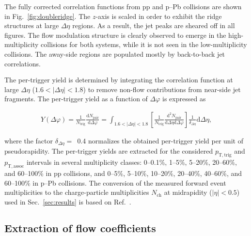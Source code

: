 The fully corrected correlation functions from pp and p--Pb collisions are shown in Fig.~\ref{fig:doubleridge}. 
The $z$-axis is scaled in order to exhibit the ridge structures at large $\Delta\eta$ regions. As a result, the jet peaks are sheared off in all figures. The flow modulation structure is clearly observed to emerge in the high-multiplicity collisions for both systems, while it is not seen in the low-multiplicity collisions. The away-side regions are populated mostly by back-to-back jet correlations. 

The per-trigger yield is determined by integrating the correlation function at large $\Delta\eta$ ($1.6<|\Delta\eta|<1.8$) to remove non-flow contributions from near-side jet fragments.
The per-trigger yield as a function of $\Delta\varphi$ is expressed as

\begin{eqnarray}
Y(\Delta\varphi) = \frac{1}{N_{\mathrm{trig}}} \frac{\mathrm{d} N_{\mathrm{pair}}}{\mathrm{d}\Delta\varphi} = \int_{1.6<|\Delta \eta|<1.8} \left[\frac{1}{N_{\mathrm{trig}}} \frac{\mathrm{d}^{2}N_{\mathrm{pair}}}{\mathrm{d}\Delta\eta \mathrm{d}\Delta\varphi}\right] \frac{1}{\delta_{\Delta\eta}} \mathrm{d}\Delta \eta,
\label{eq:pertrigger}
\end{eqnarray}

where the factor $\delta_{\Delta\eta}=$~0.4 normalizes the obtained per-trigger yield per unit of pseudorapidity.
The per-trigger yields are extracted for the considered $p_{\mathrm{T,trig}}$ and $p_{\mathrm{T,assoc}}$ intervals in several multiplicity classes: 0--0.1\%, 1--5\%, 5--20\%, 20--60\%, and 60--100\% in pp collisions, and 0--5\%, 5--10\%, 10--20\%, 20--40\%, 40--60\%, and 60--100\% in p--Pb collisions. The conversion of the measured forward event multiplicities to the charge-particle multiplicities $N_{\mathrm{ch}}$ at midrapidity ($|\eta|<0.5$) used in Sec.~\ref{sec:results} is based on Ref.~\cite{ALICE:2020swj}.

\subsection{Extraction of flow coefficients}

